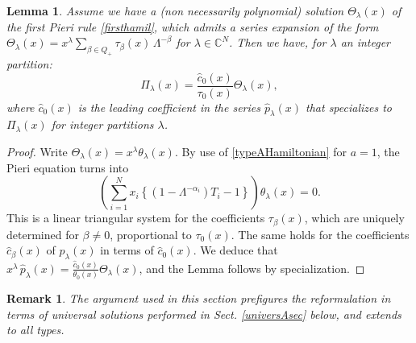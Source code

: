 \documentclass[12pt]{amsart}
\newtheorem{lemma}[thm]{Lemma}
\newtheorem{remark}[thm]{Remark}
\newcommand{\C}{{\mathbb C}}
\newcommand{\al}{{\alpha}}
\newcommand{\lL}{{\Lambda}}
\numberwithin{equation}{section}
\begin{document}
\begin{lemma}\label{uniquelem}
Assume we have a  (non necessarily polynomial) solution $\Theta_\lambda(x)$ of the first Pieri rule \eqref{firsthamil}, 
which admits a series expansion of the form $\Theta_\lambda(x)=x^\lambda \sum_{\beta\in Q_+} \tau_\beta(x)\, \lL^{-\beta}$ for $\lambda\in \C^N$.
Then we have, for $\lambda$ an integer partition:
$$\Pi_\lambda(x)=\frac{\hat c_0(x)}{\tau_0(x)} \Theta_\lambda(x), $$
where $\hat c_0(x)$ is the leading coefficient in the series $\hat p_\lambda(x)$ that specializes to 
$\Pi_\lambda(x)$ for integer partitions $\lambda$.
\end{lemma}
\begin{proof}
Write $\Theta_\lambda(x)=x^\lambda \theta_\lambda(x)$. By use of \eqref{typeAHamiltonian} for $a=1$, 
the Pieri equation turns into
$$\left(\sum_{i=1}^N x_i \left\{ (1-\lL^{-\al_i}) T_i -1\right\}\right) \theta_\lambda(x)=0 .$$
This is a linear triangular system for the coefficients $\tau_\beta(x)$, which are uniquely determined for 
$\beta\neq 0$, proportional to $\tau_0(x)$. The same holds for the coefficients $\hat c_\beta(x)$ 
of $\hat p_\lambda(x)$ in terms of $\hat c_0(x)$. We deduce that
$x^\lambda \, \hat p_\lambda(x) =\frac{\hat c_0(x)}{\theta_0(x)} \Theta_\lambda(x)$, and the Lemma follows
by specialization.
\end{proof}

\begin{remark}
The argument used in this section prefigures the reformulation in terms of universal solutions performed in Sect. \ref{universAsec} below, and extends to all types.
\end{remark}
\end{document}
